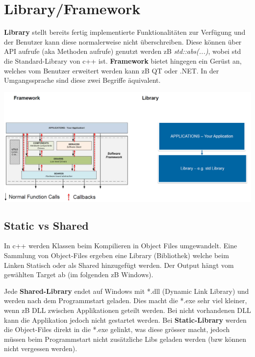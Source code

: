 \section{Library/Framework}
\textbf{Library} stellt bereits fertig implementierte Funktionalitäten zur Verfügung und der Benutzer kann diese normalerweise nicht überschreiben. Diese können über API aufrufe (aka Methoden aufrufe) genutzt werden zB \textit{std::abs(...)}, wobei std die Standard-Library von c++ ist. \textbf{Framework} bietet hingegen ein Gerüst an, welches vom Benutzer erweitert werden kann zB QT oder .NET. In der Umgangssprache sind diese zwei Begriffe äquivalent.
\begin{center}
	\includegraphics[width=\columnwidth]{Images/framework_library}
\end{center}


\subsection{Static vs Shared}
In c++ werden Klassen beim Kompilieren in Object Files umgewandelt. Eine Sammlung von Object-Files ergeben eine Library (Bibliothek) welche beim Linken Statisch oder als Shared hinzugefügt werden. Der Output hängt vom gewählten Target ab (im folgenden zB Windows). 

Jede \textbf{Shared-Library} endet auf Windows mit *.dll (Dynamic Link Library) und werden nach dem Programmstart geladen. Dies macht die *.exe sehr viel kleiner, wenn zB DLL zwischen Applikationen geteilt werden. Bei nicht vorhandenen DLL kann die Applikation jedoch nicht gestartet werden. Bei \textbf{Static-Library} werden die Object-Files direkt in die *.exe gelinkt, was diese grösser macht, jedoch müssen beim Programmstart nicht zusätzliche Libs geladen werden (bzw können nicht vergessen werden).